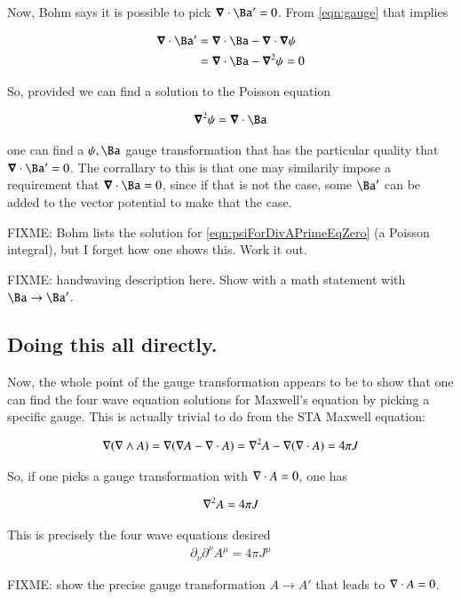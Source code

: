 \documentclass{article}
\begin{document}
Now, Bohm says it is possible to pick $\spacegrad \cdot \Ba' = 0$.  From \ref{eqn:gauge} that implies

\begin{align*}
\spacegrad \cdot \Ba'
&= \spacegrad \cdot \Ba - \spacegrad \cdot \spacegrad \psi \\
&= \spacegrad \cdot \Ba - \spacegrad^2 \psi = 0 \\
\end{align*}

So, provided we can find a solution to the Poisson equation

\begin{align}\label{eqn:psiForDivAPrimeEqZero}
\spacegrad^2 \psi = \spacegrad \cdot \Ba
\end{align}

one can find a $\psi, \Ba$ gauge transformation that has the particular quality that $\spacegrad \cdot \Ba' = 0$.  The corrallary to this
is that one may similarily impose a requirement that $\spacegrad \cdot \Ba = 0$, since if that is not the case, some $\Ba'$ can be added to the vector potential to make that the case.

FIXME: Bohm lists the solution for \ref{eqn:psiForDivAPrimeEqZero} (a Poisson integral), but I forget how one shows this.  Work it out.

FIXME: handwaving description here.  Show with a math statement with $\Ba \rightarrow \Ba'$.

\subsection{ Doing this all directly. }

Now, the whole point of the gauge transformation appears to be to show that one can find the four wave equation solutions for 
Maxwell's equation by picking a specific gauge.  This is actually trivial to do from the STA Maxwell equation:

\begin{align*}
\nabla (\nabla \wedge A) = \nabla( \nabla A - \nabla \cdot A ) = \nabla^2 A - \nabla (\nabla \cdot A) = 4 \pi J
\end{align*}

So, if one picks a gauge transformation with $\nabla \cdot A = 0$, one has

\begin{align*}
\nabla^2 A = 4 \pi J
\end{align*}

This is precisely the four wave equations desired
\begin{align*}
\partial_\nu\partial^\nu A^\mu = 4 \pi J^\mu
\end{align*}

FIXME: show the precise gauge transformation $A \rightarrow A'$ that leads to $\nabla \cdot A = 0$.



\end{document}

